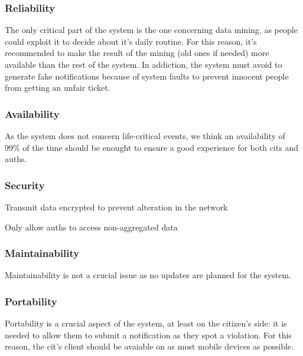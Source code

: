 \documentclass{article}
\begin{document}
		\subsubsection{Reliability}
			The only critical part of the system is the one concerning data mining, as people could exploit it to decide about it's daily routine. For this reason, it's recommended to make the result of the mining (old ones if needed) more available than the rest of the system.
			In addiction, the system must avoid to generate fake notifications because of system faults to prevent innocent people from getting an unfair ticket.
			
		\subsubsection{Availability}
			As the system does not concern life-critical events, we think an availability of 99\% of the time should be enought to ensure a good experience for both cits and auths.
			
		\subsubsection{Security}
			\begin{list}{-}{}
				\item Transmit data encrypted to prevent alteration in the network
				\item Only allow auths to access non-aggregated data
			\end{list}
			
		\subsubsection{Maintainability}
			Maintainability is not a crucial issue as no updates are planned for the system.
			
		\subsubsection{Portability}
			Portability is a crucial aspect of the system, at least on the citizen's side: it is needed to allow them to submit a notification as they spot a violation. For this reason, the cit's client should be avaiable on as most mobile devices as possible.
			
		
	
\newpage
\end{document}
